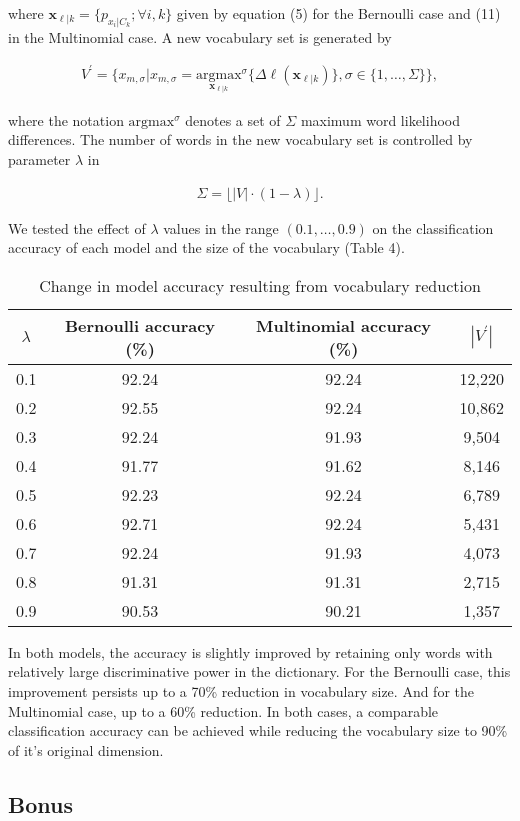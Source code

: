 \documentclass{article}
\renewcommand{\vec}[1]{\mathbf{#1}}
\begin{document}
\noindent
where $\vec{x}_{\ell|k} = \{p_{x_i|C_k}; \forall i,k\}$ given by equation (5) for the Bernoulli case and (11) in the Multinomial case. A new vocabulary set is generated by

\begin{align}
V^{\prime} = \{x_{m,\sigma} | x_{m,\sigma} = \underset{\vec{x}_{\ell|k}}{\mathrm{argmax}}^\sigma \{\Delta \ell(\vec{x}_{\ell|k})\}, \sigma \in \{1, \dots ,\Sigma\}\},
\end{align}

\noindent
where the notation $\mathrm{argmax}^\sigma$ denotes a set of $\Sigma$ maximum word likelihood differences. The number of words in the new vocabulary set is controlled by parameter $\lambda$ in 

\begin{align}
\Sigma = \lfloor|V| \cdot (1-\lambda)\rfloor.
\end{align}

\noindent
We tested the effect of $\lambda$ values in the range $(0.1,\dots,0.9)$ on the classification accuracy of each model and the size of the vocabulary (Table 4).

\begin{table}[!htb]
\centering
\caption{Change in model accuracy resulting from vocabulary reduction}
\begin{tabular}{|c|c|c|c|} \hline
	$\lambda$ & Bernoulli accuracy (\%) & Multinomial accuracy (\%) & $|V^{\prime}|$ \\ \hline
	0.1 & 92.24 & 92.24 & 12,220 \\ \hline
	0.2 & 92.55 & 92.24 & 10,862 \\ \hline
	0.3 & 92.24 & 91.93 & 9,504 \\ \hline
	0.4 & 91.77 & 91.62 & 8,146 \\ \hline
	0.5 & 92.23 & 92.24 & 6,789 \\ \hline
	0.6 & 92.71 & 92.24 & 5,431 \\ \hline
	0.7 & 92.24 & 91.93 & 4,073 \\ \hline
	0.8 & 91.31 & 91.31 & 2,715 \\ \hline
	0.9 & 90.53 & 90.21 & 1,357 \\ \hline
\end{tabular}
\end{table}

\noindent
In both models, the accuracy is slightly improved by retaining only words with relatively large discriminative power in the dictionary. For the Bernoulli case, this improvement persists up to a 70\% reduction in vocabulary size. And for the Multinomial case, up to a 60\% reduction. In both cases, a comparable classification accuracy can be achieved while reducing the vocabulary size to 90\% of it's original dimension.

\subsection{Bonus}
\end{document}
